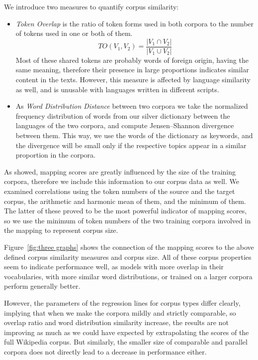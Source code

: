 \documentclass[11pt]{article}
\begin{document}
    We introduce two measures to quantify corpus similarity:
    \begin{itemize}
    
         \item \textit{Token Overlap} is the ratio of token forms used in both corpora to the number of tokens used in one or both of them. $$ {TO} (V_1, V_2) = \frac{| V_1 \cap V_2 |}{| V_1 \cup V_2 |} $$ Most of these shared tokens are probably words of foreign origin, having the same meaning, therefore their presence in large proportions indicates similar content in the texts. However, this measure is affected by language similarity as well, and is unusable with languages written in different scripts.
            
        \item As \textit{Word Distribution Distance} between two corpora we take the normalized frequency distribution of words from our silver dictionary between the languages of the two corpora, and compute Jensen--Shannon divergence between them. 
        This way, we use the words of the dictionary as keywords, and the divergence will be small only if the respective topics appear in a similar proportion in the corpora.
        
     \end{itemize}
     
    As  showed, mapping scores are greatly influenced by the size of the training corpora, therefore we include this information to our corpus data as well. We examined correlations using the token numbers of the source and the target corpus, the arithmetic and harmonic mean of them, and the minimum of them. The latter of these proved to be the most powerful indicator of mapping scores, so we use the minimum of token numbers of the two training corpora involved in the mapping to represent corpus size.
     
    Figure~\ref{fig:three graphs} shows the connection of the mapping scores to the above defined corpus similarity measures and corpus size. All of these corpus properties seem to indicate performance well, as models with more overlap in their vocabularies, with more similar word distributions, or trained on a larger corpora perform generally better. 
    
    However, the parameters of the regression lines for corpus types differ clearly, implying that when we make the corpora mildly and strictly comparable, so overlap ratio and word distribution similarity increase, the results are not improving as much as we could have expected by extrapolating the scores of the full Wikipedia corpus. But similarly, the smaller size of comparable and parallel corpora does not directly lead to a decrease in performance either.
    
\end{document}
